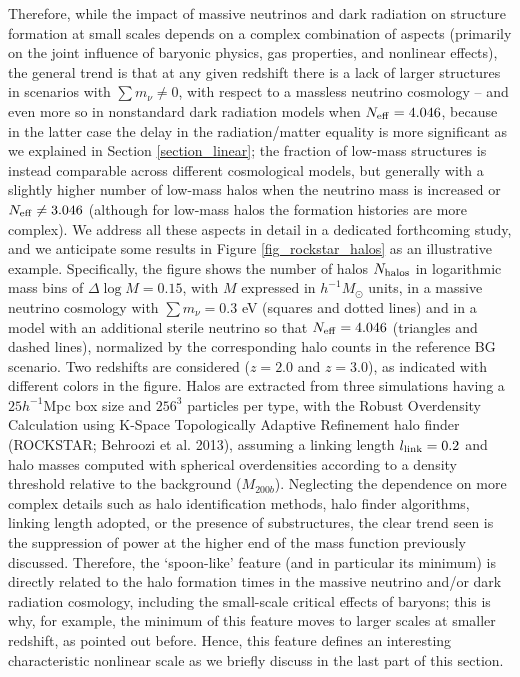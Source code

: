 \documentclass{emulateapj}
\begin{document}

Therefore, while the 
 impact of massive neutrinos and dark radiation on structure formation at small scales  depends on a complex combination of aspects 
(primarily on the joint influence of baryonic physics, gas properties, and nonlinear effects), 
the  general trend is that at any given redshift
there is a lack of larger structures  in scenarios with $\sum m_{\nu} \ne 0$, 
 with respect to a massless neutrino cosmology -- and even more so 
 in nonstandard dark radiation models when $N_{\rm eff}=4.046$, because in the latter case 
the delay in the radiation/matter equality is more significant
as we explained in Section \ref{section_linear};
the fraction of low-mass structures is instead comparable across different cosmological models,  but generally  with 
a slightly higher number of low-mass halos when the neutrino mass is increased or $N_{\rm eff} \ne 3.046$ (although for low-mass halos the formation histories  are more complex). 
We address  all these aspects in  detail in a dedicated forthcoming study, and we anticipate 
some results in Figure \ref{fig_rockstar_halos}  
 as an illustrative  example. 
Specifically, the figure shows
the  number of halos $N_{\rm halos}$ in logarithmic mass bins of $\Delta \log M=0.15$, with $M$ expressed in
$h^{-1} M_{\odot}$ units, in a massive neutrino cosmology with $\sum m_{\nu}=0.3$ eV (squares and dotted lines)
and in a model with an additional sterile neutrino so that $N_{\rm eff} =4.046$ (triangles and dashed lines), normalized by the 
corresponding  halo counts in the reference BG scenario. 
Two  redshifts are considered ($z=2.0$ and $z=3.0$), as indicated with different colors in the figure.  
Halos are extracted from three simulations having a $25h^{-1}$Mpc box size and $256^3$ particles per type,
with the 
Robust Overdensity Calculation using K-Space Topologically Adaptive Refinement halo finder
(ROCKSTAR; Behroozi et al. 2013), assuming a linking length $l_{\rm link}=0.2$ 
and halo masses computed with spherical overdensities according to a 
density threshold relative to the background  ($M_{200b}$). 
Neglecting the dependence on  more complex details such as halo identification methods, halo finder algorithms, linking length adopted, or
the presence of substructures, 
the  clear trend seen is the suppression of power 
at the higher end  of the mass function previously discussed. 
Therefore,  the `spoon-like' feature (and in particular its minimum) is directly related to
 the halo formation times in the massive neutrino and/or dark radiation cosmology, including the small-scale critical effects of baryons; this is why, for example, the minimum of this 
feature moves to larger scales at smaller redshift, as pointed out before.
Hence,  this feature defines  an interesting  characteristic  nonlinear scale as we briefly discuss in the last part of this section. 
 
\end{document}
